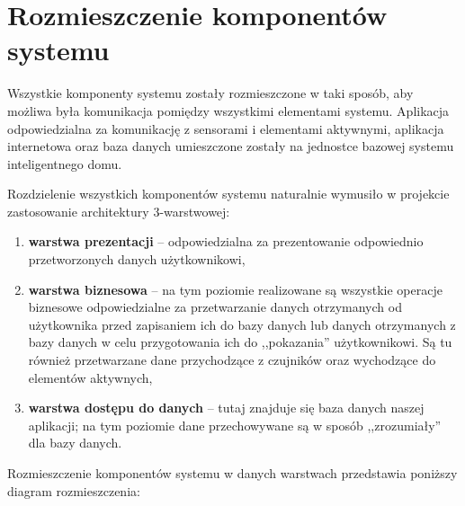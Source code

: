 \documentclass[eng,oneside]{mgr}
\begin{document}
\section{Rozmieszczenie komponentów systemu}
Wszystkie komponenty systemu zostały rozmieszczone w taki sposób, aby możliwa była komunikacja pomiędzy wszystkimi elementami systemu. Aplikacja odpowiedzialna za komunikację z sensorami i elementami aktywnymi, aplikacja internetowa oraz baza danych umieszczone zostały na jednostce bazowej systemu inteligentnego domu.

Rozdzielenie wszystkich komponentów systemu naturalnie wymusiło w projekcie zastosowanie architektury 3-warstwowej:
\begin{enumerate}
	\item \textbf{warstwa prezentacji} – odpowiedzialna za prezentowanie odpowiednio przetworzonych danych użytkownikowi,
	\item \textbf{warstwa biznesowa} – na tym poziomie realizowane są wszystkie operacje biznesowe odpowiedzialne za przetwarzanie danych otrzymanych od użytkownika przed zapisaniem ich do bazy danych lub danych otrzymanych z bazy danych w celu przygotowania ich do ,,pokazania'' użytkownikowi. Są tu również przetwarzane dane przychodzące z czujników oraz wychodzące do elementów aktywnych,
	\item \textbf{warstwa dostępu do danych} – tutaj znajduje się baza danych naszej aplikacji; na tym poziomie dane przechowywane są w sposób ,,zrozumiały'' dla bazy danych.
\end{enumerate}
Rozmieszczenie komponentów systemu w danych warstwach przedstawia poniższy diagram rozmieszczenia:
\clearpage
\end{document}
